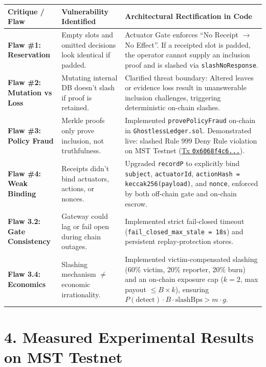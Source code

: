 \documentclass[11pt,a4paper]{article}
\begin{document}
\begin{table}[h!]
\small
\centering
\begin{tabularx}{\textwidth}{lXX}
\toprule
\textbf{Critique / Flaw} & \textbf{Vulnerability Identified} & \textbf{Architectural Rectification in Code} \\
\midrule
\textbf{Flaw \#1: Reservation} & Empty slots and omitted decisions look identical if padded. & Actuator Gate enforces ``No Receipt $\rightarrow$ No Effect''. If a receipted slot is padded, the operator cannot supply an inclusion proof and is slashed via \texttt{slashNoResponse}. \\
\addlinespace
\textbf{Flaw \#2: Mutation vs Loss} & Mutating internal DB doesn't slash if proof is retained. & Clarified threat boundary: Altered leaves or evidence loss result in unanswerable inclusion challenges, triggering deterministic on-chain slashes. \\
\addlinespace
\textbf{Flaw \#3: Policy Fraud} & Merkle proofs only prove inclusion, not truthfulness. & Implemented \texttt{provePolicyFraud} on-chain in \texttt{GhostlessLedger.sol}. Demonstrated live: slashed Rule 999 Deny Rule violation on MST Testnet (\href{https://mstscan.com/tx/0x6068f4c661d9170c8fcf38b789922f37412bacc9bd1d5e8fc983edf224fb0acf}{Tx \texttt{0x6068f4c6...}}). \\
\addlinespace
\textbf{Flaw \#4: Weak Binding} & Receipts didn't bind actuators, actions, or nonces. & Upgraded \texttt{recordP} to explicitly bind \texttt{subject}, \texttt{actuatorId}, \texttt{actionHash = keccak256(payload)}, and \texttt{nonce}, enforced by both off-chain gate and on-chain escrow. \\
\addlinespace
\textbf{Flaw 3.2: Gate Consistency} & Gateway could lag or fail open during chain outages. & Implemented strict fail-closed timeout (\texttt{fail\_closed\_max\_stale = 18s}) and persistent replay-protection stores. \\
\addlinespace
\textbf{Flaw 3.4: Economics} & Slashing mechanism $\neq$ economic irrationality. & Implemented victim-compensated slashing (60\% victim, 20\% reporter, 20\% burn) and an on-chain exposure cap ($k=2$, max payout $\le B \times k$), ensuring $P(\text{detect}) \cdot B \cdot \text{slashBps} > m \cdot g$. \\
\bottomrule
\end{tabularx}
\end{table}

\section{4. Measured Experimental Results on MST Testnet}
\end{document}
